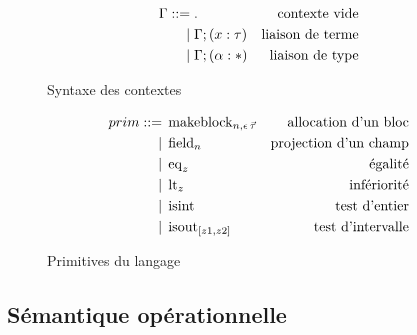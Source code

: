 \begin{figure}
\begin{align*}
  \Gamma ::=& \; .
    & \text{contexte vide}
  \\ |& \; \Gamma; (x : \tau)
    & \text{liaison de terme}
  \\ |& \; \Gamma; (\alpha : *)
    & \text{liaison de type}
\end{align*}
\caption{Syntaxe des contextes}
\end{figure}

\begin{figure}
\begin{align*}
  prim ::=& \; \operatorname{makeblock}_{n,\epsilon \, \vec{\tau}}
    & \text{allocation d'un bloc}
  \\ |& \; \operatorname{field}_{n}
    & \text{projection d'un champ}
  \\ |& \; \operatorname{eq}_{z}
    & \text{égalité}
  \\ |& \; \operatorname{lt}_{z}
    & \text{infériorité}
  \\ |& \; \operatorname{isint}
    & \text{test d'entier}
  \\ |& \; \operatorname{isout}_{[z1,z2]}
    & \text{test d'intervalle}
\end{align*}
\caption{Primitives du langage}
\end{figure}

\pagebreak

\subsection{Sémantique opérationnelle}

